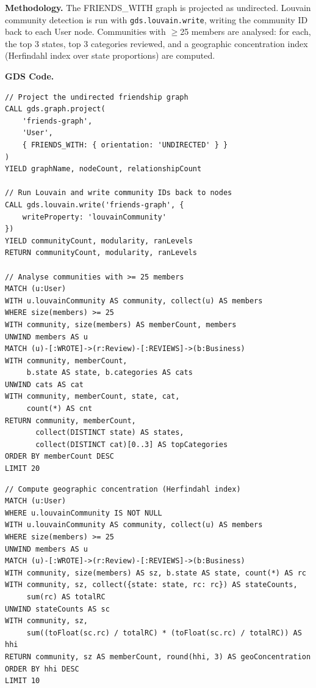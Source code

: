 \documentclass[11pt]{article}
\begin{document}
\textbf{Methodology.} The FRIENDS\_WITH graph is projected as undirected. Louvain community detection is run with \texttt{gds.louvain.write}, writing the community ID back to each User node. Communities with $\geq$25 members are analysed: for each, the top 3 states, top 3 categories reviewed, and a geographic concentration index (Herfindahl index over state proportions) are computed.

\textbf{GDS Code.}
\begin{lstlisting}[style=cypher, caption={Louvain community detection on the friendship graph.}, label={lst:gds-q2}]
// Project the undirected friendship graph
CALL gds.graph.project(
    'friends-graph',
    'User',
    { FRIENDS_WITH: { orientation: 'UNDIRECTED' } }
)
YIELD graphName, nodeCount, relationshipCount

// Run Louvain and write community IDs back to nodes
CALL gds.louvain.write('friends-graph', {
    writeProperty: 'louvainCommunity'
})
YIELD communityCount, modularity, ranLevels
RETURN communityCount, modularity, ranLevels

// Analyse communities with >= 25 members
MATCH (u:User)
WITH u.louvainCommunity AS community, collect(u) AS members
WHERE size(members) >= 25
WITH community, size(members) AS memberCount, members
UNWIND members AS u
MATCH (u)-[:WROTE]->(r:Review)-[:REVIEWS]->(b:Business)
WITH community, memberCount,
     b.state AS state, b.categories AS cats
UNWIND cats AS cat
WITH community, memberCount, state, cat,
     count(*) AS cnt
RETURN community, memberCount,
       collect(DISTINCT state) AS states,
       collect(DISTINCT cat)[0..3] AS topCategories
ORDER BY memberCount DESC
LIMIT 20
\end{lstlisting}

\begin{lstlisting}[style=cypher, caption={Geographic concentration index per community.}, label={lst:gds-q2-geo}]
// Compute geographic concentration (Herfindahl index)
MATCH (u:User)
WHERE u.louvainCommunity IS NOT NULL
WITH u.louvainCommunity AS community, collect(u) AS members
WHERE size(members) >= 25
UNWIND members AS u
MATCH (u)-[:WROTE]->(r:Review)-[:REVIEWS]->(b:Business)
WITH community, size(members) AS sz, b.state AS state, count(*) AS rc
WITH community, sz, collect({state: state, rc: rc}) AS stateCounts,
     sum(rc) AS totalRC
UNWIND stateCounts AS sc
WITH community, sz,
     sum((toFloat(sc.rc) / totalRC) * (toFloat(sc.rc) / totalRC)) AS hhi
RETURN community, sz AS memberCount, round(hhi, 3) AS geoConcentration
ORDER BY hhi DESC
LIMIT 10
\end{lstlisting}
\end{document}
